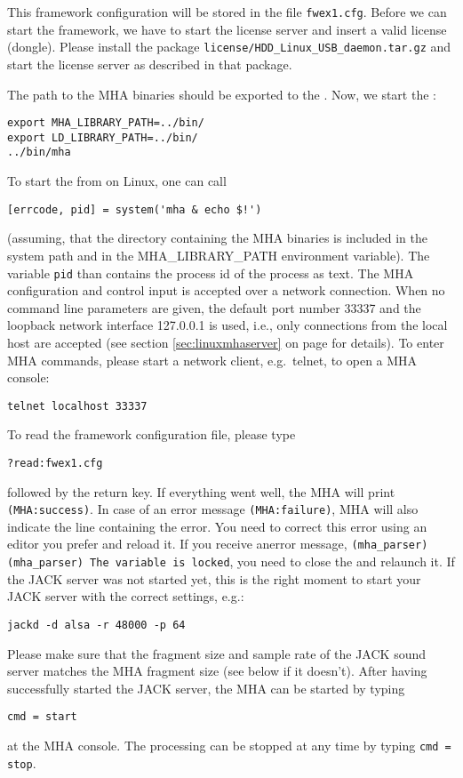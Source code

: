This framework configuration will be stored in the file
\verb!fwex1.cfg!. Before we can start the framework, we have to start
the license server and insert a valid license (dongle). Please install
the package \verb!license/HDD_Linux_USB_daemon.tar.gz! and start the
license server as described in that package.

The path to the MHA binaries should be exported to the \mhad{}.
Now, we start the \mhad{}:
%
\begin{verbatim}
export MHA_LIBRARY_PATH=../bin/
export LD_LIBRARY_PATH=../bin/
../bin/mha
\end{verbatim}
%
To start the \mhad{} from \Matlab{} on Linux, one can call
\begin{verbatim}
[errcode, pid] = system('mha & echo $!')
\end{verbatim}
(assuming, that the directory containing the MHA binaries is included
in the system path and in the MHA\_LIBRARY\_PATH environment
variable).
%
The variable \verb!pid! than contains the process id of the \mhad{} process as text.
%
The MHA configuration and control
input is accepted over a network connection. 
%
When no command line parameters are given, the default port number
33337 and the loopback network interface 127.0.0.1 is used, i.e., only
connections from the local host are accepted (see section
\ref{sec:linuxmhaserver} on page \pageref{sec:linuxmhaserver} for
details).
%
To enter MHA commands, please start a network client, e.g.\ telnet, to
open a MHA console:
\begin{verbatim}telnet localhost 33337\end{verbatim}

To read the framework configuration file, please type
\begin{verbatim}
?read:fwex1.cfg
\end{verbatim}
followed by the return key. If everything went well, the MHA will print
\verb!(MHA:success)!. In case of an error message \verb!(MHA:failure)!, MHA will also indicate the line containing the error. You need to correct this error using an editor you prefer and  reload it. If you receive anerror message, \verb!(mha_parser) (mha_parser) The variable is locked!, you need to close the \mhad{} and relaunch it. If the JACK server was not started yet, this is the
right moment to start your JACK server with the correct settings,
e.g.:
\begin{verbatim}
jackd -d alsa -r 48000 -p 64
\end{verbatim}
Please make sure that the fragment size and sample rate of the JACK
sound server matches the MHA fragment size (see below if it
doesn't). After having successfully started the JACK server, the MHA
can be started by typing
\begin{verbatim}
cmd = start
\end{verbatim}
at the MHA console. The processing can be stopped at any time by
typing \verb!cmd = stop!.

